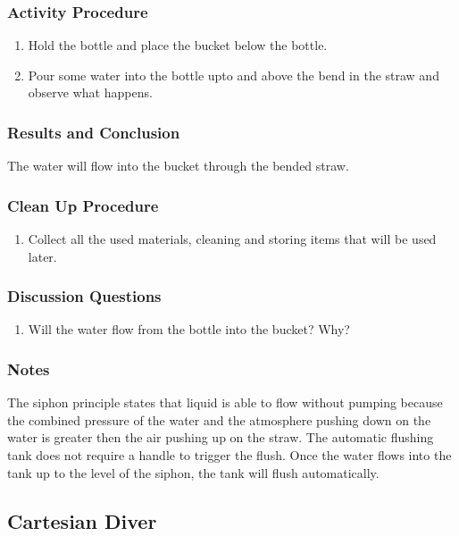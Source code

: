\subsubsection*{Activity Procedure}
\begin{enumerate}
\item{Hold the bottle and place the bucket below the bottle.} 
\item{Pour some water into the bottle upto and above the bend in the straw and observe what happens.} 
\end{enumerate}

\subsubsection*{Results and Conclusion}
The water will flow into the bucket through the bended straw. 

\subsubsection*{Clean Up Procedure}
\begin{enumerate}
\item{Collect all the used materials, cleaning and storing items that will be used later.}
\end{enumerate}

\subsubsection*{Discussion Questions}
\begin{enumerate}
\item{Will the water flow from the bottle into the bucket? Why?}
\end{enumerate}

\subsubsection*{Notes}
The siphon principle states that liquid is able to flow without pumping because the combined pressure of the water and the atmosphere pushing down on the water is greater then the air pushing up on the straw. The automatic flushing tank does not require a handle to trigger the flush. Once the water flows into the tank up to the level of the siphon, the tank will flush automatically.  


\subsection{Cartesian Diver}

